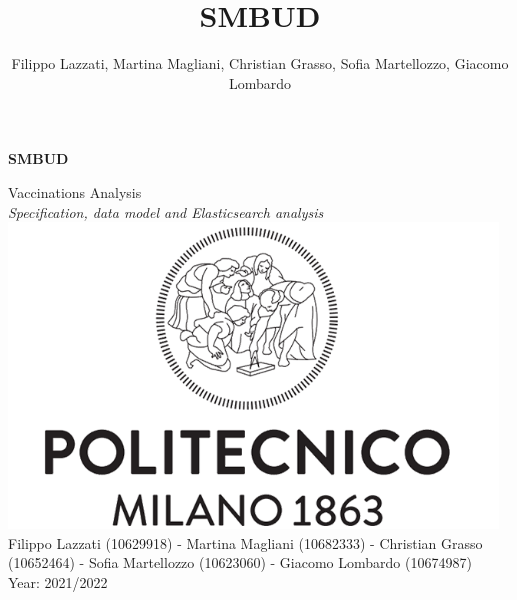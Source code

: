 \documentclass{article}
\title{SMBUD}
\author{Filippo Lazzati, Martina Magliani, Christian Grasso, Sofia Martellozzo, Giacomo Lombardo}
\begin{document}
\thispagestyle{empty}
\begin{titlepage}
    \begin{center}
       {\Huge \textbf{SMBUD}} %
       \vspace{0.5cm}
       \\
    \begin{LARGE}
        {Vaccinations Analysis}
        \vspace{1.0cm}
        \\
        {\textit{Specification, data model and Elasticsearch analysis}}
           \includegraphics[width=13cm]{logo/polimi.png}
          \vspace{1.5cm}\\
                  Filippo Lazzati (10629918) - Martina Magliani (10682333) - Christian Grasso (10652464) - Sofia Martellozzo (10623060) - Giacomo Lombardo (10674987)\\
       {Year: 2021/2022}
    \end{LARGE}  
   \end{center}
\end{titlepage}
\newpage
\tableofcontents %
\newpage
\end{document}
